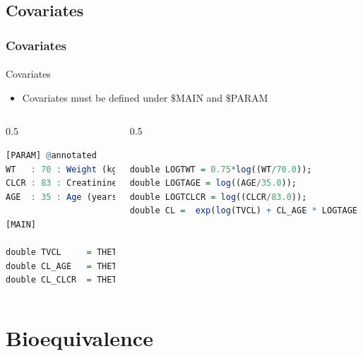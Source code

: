 \documentclass[
	11pt, %
]{beamer}
\begin{document}
\subsection{Covariates}
\begin{frame}[fragile]
	\frametitle{Covariates}
	\framesubtitle{} %
	\begin{block}{Covariates}
	\small
\begin{itemize}
\item Covariates must be defined under $\$$MAIN and $\$$PARAM
\end{itemize}
\end{block}
  \begin{columns}[c] 
		\begin{column}{0.5\textwidth} %
		\tiny
\begin{lstlisting}[language=R]
[PARAM] @annotated
WT   : 70 : Weight (kg)
CLCR : 83 : Creatinine clearance (ml/min)
AGE  : 35 : Age (years)

[MAIN]

double TVCL     = THETA1;
double CL_AGE   = THETA5;
double CL_CLCR  = THETA9;

\end{lstlisting}
\end{column}
		\begin{column}{0.5\textwidth} %
\begin{lstlisting}[language=R]

double LOGTWT = 0.75*log((WT/70.0));
double LOGTAGE = log((AGE/35.0));
double LOGTCLCR = log((CLCR/83.0));
double CL =  exp(log(TVCL) + CL_AGE * LOGTAGE + CL_CLCR * LOGTCLCR + LOGTWT + ETA(1)) ;
\end{lstlisting}
		\end{column}
\end{columns}
\end{frame}

 \section{Bioequivalence}
 
\end{document}
